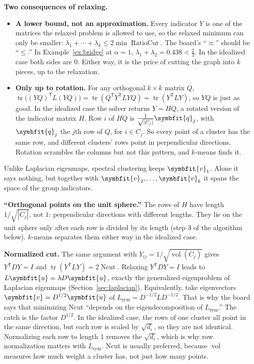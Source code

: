 \documentclass[11pt]{article}
\newcommand{\bm}[1]{\symbfit{#1}}
\newcommand{\T}{^{\mathsf T}}
\newcommand{\tr}{\operatorname{tr}}
\begin{document}
\begin{intuition}
\textbf{Two consequences of relaxing.}
\begin{itemize}[nosep,leftmargin=*]
\item \textbf{A lower bound, not an approximation.} Every indicator $Y$ is one of the matrices the relaxed problem is allowed to use, so the relaxed minimum can only be smaller: $\lambda_1+\cdots+\lambda_k\le2\min\operatorname{RatioCut}$. The board's ``$\approx$'' should be ``$\le$.'' In Example~\ref{ex:bridge} at $\alpha=1$, $\lambda_1+\lambda_2=0.438<\frac23$. In the idealized case both sides are $0$. Either way, it is the price of cutting the graph into $k$ pieces, up to the relaxation.
\item \textbf{Only up to rotation.} For any orthogonal $k\times k$ matrix $Q$, $\tr\big((YQ)\T L(YQ)\big)=\tr(Q\T Y\T LYQ)=\tr(Y\T LY)$, so $YQ$ is just as good. In the idealized case the solver returns $Y=HQ$, a rotated version of the indicator matrix $H$. Row $i$ of $HQ$ is $\frac1{\sqrt{|C_j|}}\bm q_j$, with $\bm q_j$ the $j$th row of $Q$, for $i\in C_j$. So every point of a cluster has the same row, and different clusters' rows point in perpendicular directions. Rotation scrambles the columns but not this pattern, and $k$-means finds it.
\end{itemize}
Unlike Laplacian eigenmaps, spectral clustering keeps $\bm v_1$. Alone it says nothing, but together with $\bm v_2,\dots,\bm v_k$ it spans the space of the group indicators.
\end{intuition}

\begin{careful}
\textbf{``Orthogonal points on the unit sphere.''} The rows of $H$ have length $1/\sqrt{|C_j|}$, not $1$: perpendicular directions with different lengths. They lie on the unit sphere only after each row is divided by its length (step 3 of the algorithm below). $k$-means separates them either way in the idealized case.
\end{careful}

\textbf{Normalized cut.} The same argument with $Y_{ij}=1/\sqrt{\operatorname{vol}(C_j)}$ gives $Y\T DY=I$ and $\tr(Y\T LY)=2\operatorname{Ncut}$. Relaxing $Y\T DY=I$ leads to $L\bm u=\lambda D\bm u$, exactly the generalized eigenproblem of Laplacian eigenmaps (Section~\ref{sec:laplacian}). Equivalently, take eigenvectors $\bm v=D^{1/2}\bm u$ of $L_{\mathrm{sym}}=D^{-1/2}LD^{-1/2}$. That is why the board says that minimizing Ncut ``depends on the eigendecomposition of $L_{\mathrm{sym}}$.'' The catch is the factor $D^{1/2}$. In the idealized case, the rows of one cluster all point in the same direction, but each row is scaled by $\sqrt{d_i}$, so they are not identical. Normalizing each row to length $1$ removes the $\sqrt{d_i}$, which is why row normalization matters with $L_{\mathrm{sym}}$. Ncut is usually preferred, because $\operatorname{vol}$ measures how much weight a cluster has, not just how many points.
\end{document}
